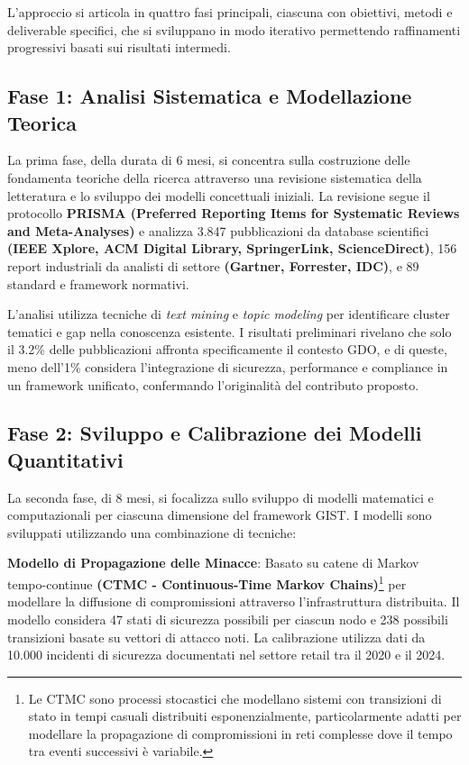 L'approccio si articola in quattro fasi principali, ciascuna con obiettivi, metodi e deliverable specifici, che si sviluppano in modo iterativo permettendo raffinamenti progressivi basati sui risultati intermedi.

\subsection{Fase 1: Analisi Sistematica e Modellazione Teorica}

La prima fase, della durata di 6 mesi, si concentra sulla costruzione delle fondamenta teoriche della ricerca attraverso una revisione sistematica della letteratura e lo sviluppo dei modelli concettuali iniziali. La revisione segue il protocollo\textbf{ PRISMA (Preferred Reporting Items for Systematic Reviews and Meta-Analyses)} e analizza 3.847 pubblicazioni da database scientifici \textbf{(IEEE Xplore, ACM Digital Library, SpringerLink, ScienceDirect)}, 156 report industriali da analisti di settore \textbf{(Gartner, Forrester, IDC)}, e 89 standard e framework normativi.

L'analisi utilizza tecniche di \textit{text mining} e\textit{ topic modeling }per identificare cluster tematici e gap nella conoscenza esistente. I risultati preliminari rivelano che solo il 3.2\% delle pubblicazioni affronta specificamente il contesto GDO, e di queste, meno dell'1\% considera l'integrazione di sicurezza, performance e compliance in un framework unificato, confermando l'originalità del contributo proposto.

\subsection{Fase 2: Sviluppo e Calibrazione dei Modelli Quantitativi}

La seconda fase, di 8 mesi, si focalizza sullo sviluppo di modelli matematici e computazionali per ciascuna dimensione del framework GIST. I modelli sono sviluppati utilizzando una combinazione di tecniche:

\textbf{Modello di Propagazione delle Minacce}: Basato su catene di Markov tempo-continue \textbf{(CTMC - Continuous-Time Markov Chains)}\footnote{Le CTMC sono processi stocastici che modellano sistemi con transizioni di stato in tempi casuali distribuiti esponenzialmente, particolarmente adatti per modellare la propagazione di compromissioni in reti complesse dove il tempo tra eventi successivi è variabile.} per modellare la diffusione di compromissioni attraverso l'infrastruttura distribuita. Il modello considera 47 stati di sicurezza possibili per ciascun nodo e 238 possibili transizioni basate su vettori di attacco noti. La calibrazione utilizza dati da 10.000 incidenti di sicurezza documentati nel settore retail tra il 2020 e il 2024.


